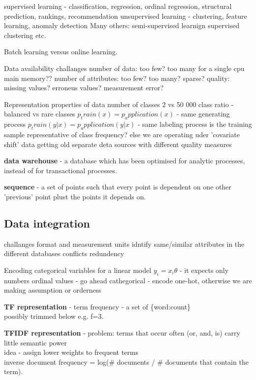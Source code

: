 \documentclass{article}
\newcommand{\para}[0]{\par\vspace{0.2cm}\noindent}
\newcommand{\define}[2]{\textbf{#1} - {#2}.  \para}
\begin{document}
supervised learning - classification, regression, ordinal regression, structural prediction, rankings, recommendation
unsupervised learning - clustering, feature learning, anomaly detection
Many others:
    semi-supervised learnign
    supervised clustering
    etc.

Batch learning versus online learning.

Data availability challanges
number of data: too few? too many for a single cpu main memory??
number of attributes: too few? too many? sparse?
quality: missing values? erroneus values? measurement error?

Representation properties of data
number of classes 2 vs 50 000
class ratio - balanced vs rare classes
$p_train(x) = p_application(x)$ - same generating process
$p_train(y|x) = p_application(y|x)$ - same labeling process
is the training sample representative of class frequency? else we are operating uder 'covariate shift'
data getting old
separate deta sources with different quality measures

\define{data warehouse}
           {a database which has been optimised for analytic processes, instead of for transactional processes}

\define{sequence}
           {a set of points such that every point is dependent on one other 'previous' point plust the points it depends on}

\subsection{Data integration} challanges
    format and measurement units
    idntify same/similar attributes in the different databases
    conflicts
    redundency

Encoding categorical variables for a linear model $y_i = x_i \theta$ - it expects only numbers
    ordinal values - go ahead
    cathegorical - encode one-hot, otherwise we are making assumption or orderness

\define{TF representation}
           {term frequency - a set of \{word:count\}  \\
            possibly trimmed below e.g. f=3}

\define{TFIDF representation}
           {problem: terms that occur often (or, and, is) carry little semantic power  \\
            idea - assign lower weights to frequent terms  \\
            inverse document frequency = log(\# documents / \# documents that contain the term)}
\end{document}
